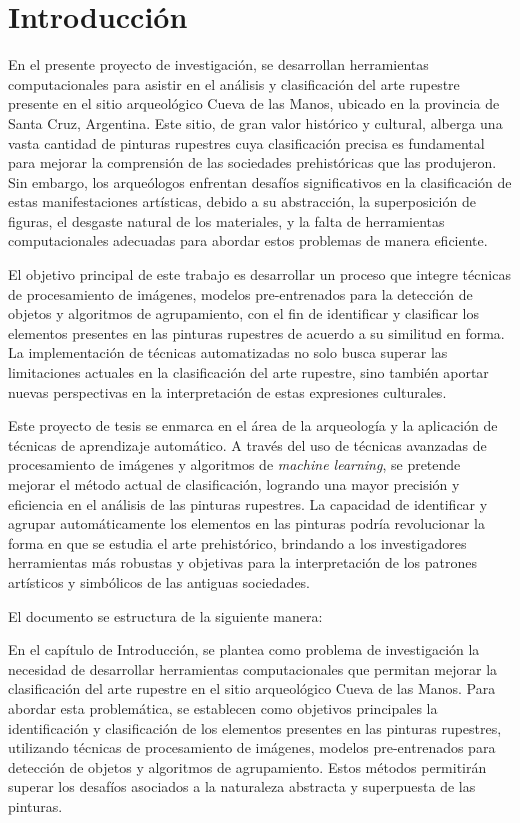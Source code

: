 \chapter{Introducción}

En el presente proyecto de investigación, se desarrollan herramientas computacionales para asistir en el análisis y clasificación del arte rupestre presente en el sitio arqueológico Cueva de las Manos, ubicado en la provincia de Santa Cruz, Argentina. Este sitio, de gran valor histórico y cultural, alberga una vasta cantidad de pinturas rupestres cuya clasificación precisa es fundamental para mejorar la comprensión de las sociedades prehistóricas que las produjeron. Sin embargo, los arqueólogos enfrentan desafíos significativos en la clasificación de estas manifestaciones artísticas, debido a su abstracción, la superposición de figuras, el desgaste natural de los materiales, y la falta de herramientas computacionales adecuadas para abordar estos problemas de manera eficiente.

El objetivo principal de este trabajo es desarrollar un proceso que integre técnicas de procesamiento de imágenes, modelos pre-entrenados para la detección de objetos y algoritmos de agrupamiento, con el fin de identificar y clasificar los elementos presentes en las pinturas rupestres de acuerdo a su similitud en forma. La implementación de técnicas automatizadas no solo busca superar las limitaciones actuales en la clasificación del arte rupestre, sino también aportar nuevas perspectivas en la interpretación de estas expresiones culturales.

Este proyecto de tesis se enmarca en el área de la arqueología y la aplicación de técnicas de aprendizaje automático. A través del uso de técnicas avanzadas de procesamiento de imágenes y algoritmos de \textit{machine learning}, se pretende mejorar el método actual de clasificación, logrando una mayor precisión y eficiencia en el análisis de las pinturas rupestres. La capacidad de identificar y agrupar automáticamente los elementos en las pinturas podría revolucionar la forma en que se estudia el arte prehistórico, brindando a los investigadores herramientas más robustas y objetivas para la interpretación de los patrones artísticos y simbólicos de las antiguas sociedades.

El documento se estructura de la siguiente manera:

En el capítulo de Introducción, se plantea como problema de investigación la necesidad de desarrollar herramientas computacionales que permitan mejorar la clasificación del arte rupestre en el sitio arqueológico Cueva de las Manos. Para abordar esta problemática, se establecen como objetivos principales la identificación y clasificación de los elementos presentes en las pinturas rupestres, utilizando técnicas de procesamiento de imágenes, modelos pre-entrenados para detección de objetos y algoritmos de agrupamiento. Estos métodos permitirán superar los desafíos asociados a la naturaleza abstracta y superpuesta de las pinturas.

